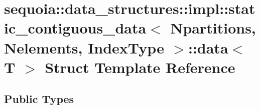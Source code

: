 \hypertarget{structsequoia_1_1data__structures_1_1impl_1_1static__contiguous__data_1_1data}{}\section{sequoia\+::data\+\_\+structures\+::impl\+::static\+\_\+contiguous\+\_\+data$<$ Npartitions, Nelements, Index\+Type $>$\+::data$<$ T $>$ Struct Template Reference}
\label{structsequoia_1_1data__structures_1_1impl_1_1static__contiguous__data_1_1data}
\subsection*{Public Types}
